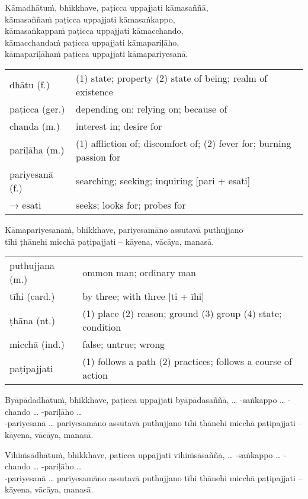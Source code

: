 \documentclass[11pt,oneside]{memoir}
\begin{document}
Kāmadhātuṁ, bhikkhave, paṭicca uppajjati kāmasaññā, \\[0pt]
kāmasaññaṁ paṭicca uppajjati kāmasaṅkappo, \\[0pt]
kāmasaṅkappaṁ paṭicca uppajjati kāmacchando, \\[0pt]
kāmacchandaṁ paṭicca uppajjati kāmapariḷāho, \\[0pt]
kāmapariḷāhaṁ paṭicca uppajjati kāmapariyesanā.

\begin{longtable}{L{\colOne} L{\colTwo}}
dhātu (f.) & (1) state; property (2) state of being; realm of existence\\[0pt]
paṭicca (ger.) & depending on; relying on; because of\\[0pt]
chanda (m.) & interest in; desire for\\[0pt]
pariḷāha (m.) & (1) affliction of; discomfort of; (2) fever for; burning passion for\\[0pt]
pariyesanā (f.) & searching; seeking; inquiring [pari + esati]\\[0pt]
→ esati & seeks; looks for; probes for\\[0pt]
\end{longtable}

\clearpage

Kāmapariyesanaṁ, bhikkhave, pariyesamāno assutavā puthujjano \\[0pt]
tīhi ṭhānehi micchā paṭipajjati -- kāyena, vācāya, manasā.

\begin{longtable}{L{\colOne} L{\colTwo}}
puthujjana (m.) & ommon man; ordinary man\\[0pt]
tīhi (card.) & by three; with three [ti + īhi]\\[0pt]
ṭhāna (nt.) & (1) place (2) reason; ground (3) group (4) state; condition\\[0pt]
micchā (ind.) & false; untrue; wrong\\[0pt]
paṭipajjati & (1) follows a path (2) practices; follows a course of action\\[0pt]
\end{longtable}

Byāpādadhātuṁ, bhikkhave, paṭicca uppajjati byāpādasaññā,
\ldots{} -saṅkappo \ldots{} -chando \ldots{} -pariḷāho \ldots{} \\[0pt]
-pariyesanā \ldots{} pariyesamāno assutavā puthujjano
tīhi ṭhānehi micchā paṭipajjati -- kāyena, vācāya, manasā.

Vihiṁsādhātuṁ, bhikkhave, paṭicca uppajjati vihiṁsāsaññā,
\ldots{} -saṅkappo \ldots{} -chando \ldots{} -pariḷāho \ldots{} \\[0pt]
-pariyesanā \ldots{} pariyesamāno assutavā puthujjano
tīhi ṭhānehi micchā paṭipajjati -- kāyena, vācāya, manasā.
\end{document}
